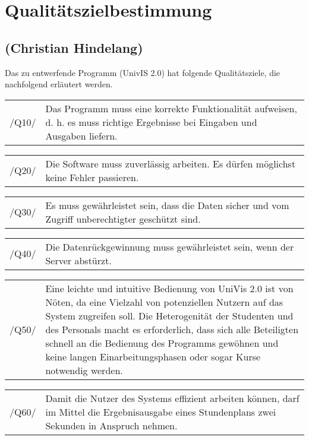\section{Qualitätszielbestimmung}
\label{sec:Qualitätszielbestimmung}

\subsection*{(Christian Hindelang)}

Das zu entwerfende Programm (UnivIS 2.0) hat folgende Qualitätsziele, die nachfolgend erläutert werden. 

\begin{tabular}{p{1.5cm}p{14.5cm}}
 /Q10/	& Das Programm muss eine korrekte Funktionalität aufweisen, d. h. es muss richtige Ergebnisse bei Eingaben und Ausgaben liefern. \\[0.25cm]	 
\end{tabular}

\begin{tabular}{p{1.5cm}p{14.5cm}}
 /Q20/	& Die Software muss zuverlässig arbeiten. Es dürfen möglichst keine Fehler passieren. \\[0.25cm]	 
 \end{tabular}

\begin{tabular}{p{1.5cm}p{14.5cm}}
 /Q30/	& Es muss gewährleistet sein, dass die Daten sicher und vom Zugriff unberechtigter geschützt sind. \\[0.25cm]	 
\end{tabular}

\begin{tabular}{p{1.5cm}p{14.5cm}}
 /Q40/	& Die Datenrückgewinnung muss gewährleistet sein, wenn der Server abstürzt. \\[0.25cm]	 
\end{tabular}

\begin{tabular}{p{1.5cm}p{14.5cm}}
 /Q50/	& Eine leichte und intuitive Bedienung von UniVis 2.0 ist von Nöten, da eine Vielzahl von potenziellen Nutzern auf das System zugreifen soll. Die Heterogenität der Studenten und des Personals macht es erforderlich, dass sich alle Beteiligten schnell an die Bedienung des Programms gewöhnen und keine langen Einarbeitungsphasen oder sogar Kurse notwendig werden. \\[0.25cm]	 
\end{tabular}

\begin{tabular}{p{1.5cm}p{14.5cm}}
 /Q60/	& Damit die Nutzer des Systems effizient arbeiten können, darf im Mittel die Ergebnisausgabe eines Stundenplans zwei Sekunden in Anspruch nehmen. \\[0.25cm]	 
\end{tabular}

